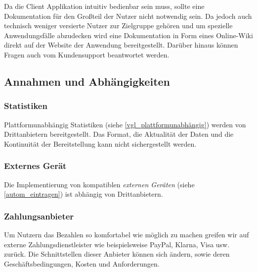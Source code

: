 Da die Client Applikation intuitiv bedienbar sein muss, sollte eine Dokumentation für den Großteil der Nutzer nicht notwendig sein. Da jedoch auch technisch weniger versierte Nutzer zur Zielgruppe gehören und um spezielle Anwendungsfälle abzudecken wird eine Dokumentation in Form eines Online-Wiki direkt auf der Website der Anwendung bereitgestellt. Darüber hinaus können Fragen auch vom Kundensupport beantwortet werden.

\subsection{Annahmen und Abhängigkeiten}


\subsubsection{Statistiken}
Plattformunabhängig Statistiken (siehe \ref{vgl_plattformunabhängig}) werden von Drittanbietern bereitgestellt. Das Format, die Aktualität der Daten und die Kontinuität der Bereitstellung kann nicht sichergestellt werden.


\subsubsection{Externes Gerät}
Die Implementierung von kompatiblen \textit{externen Geräten} (siehe \ref{autom_eintragen}) ist abhängig von Drittanbietern.

\subsubsection{Zahlungsanbieter}

Um Nutzern das Bezahlen so komfortabel wie möglich zu machen greifen wir auf externe Zahlungsdienstleister wie beispielsweise PayPal, Klarna, Visa usw. zurück. Die Schnittstellen dieser Anbieter können sich ändern, sowie deren Geschäftsbedingungen, Kosten und Anforderungen.
